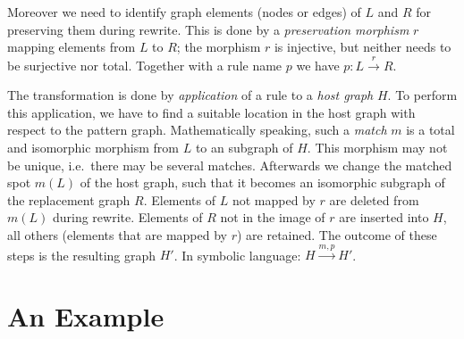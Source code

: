 Moreover we need to identify graph elements (nodes or edges) of $L$ and $R$ for preserving them during rewrite. 
This is done by a \emph{preservation morphism} $r$ mapping elements from $L$ to $R$; the morphism $r$ is injective, but neither needs to be surjective nor total.
Together with a rule name $p$ we have $p : L \xrightarrow{r} R$.

The transformation is done by \emph{application} of a rule to a \emph{host graph} $H$.
To perform this application, we have to find a suitable location in the host graph with respect to the pattern graph.
Mathematically speaking, such a \emph{match} $m$ is a total and isomorphic morphism from $L$ to an subgraph of $H$.
This morphism may not be unique, i.e.\ there may be several matches.
Afterwards we change the matched spot $m(L)$ of the host graph, such that it becomes an isomorphic subgraph of the replacement graph $R$.
Elements of $L$ not mapped by $r$ are deleted from $m(L)$ during rewrite.
Elements of $R$ not in the image of $r$ are inserted into $H$, all others (elements that are mapped by $r$) are retained.
The outcome of these steps is the resulting graph $H'$. In symbolic language: $H \xrightarrow{m,p} H'$.


\section{An Example}

